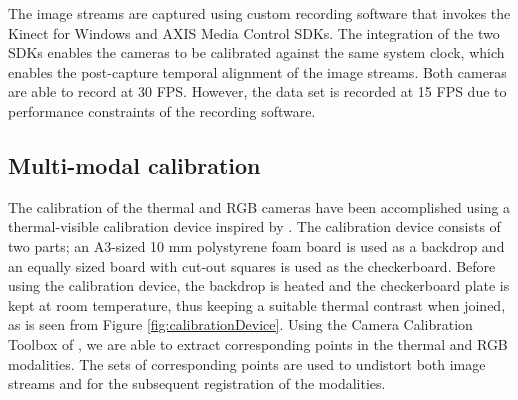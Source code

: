\documentclass[10pt,twocolumn,letterpaper]{article}
\begin{document}
The image streams are captured using custom recording software that invokes the Kinect for Windows and AXIS Media Control SDKs. The integration of the two SDKs enables the cameras to be calibrated against the same system clock, which enables the post-capture temporal alignment of the image streams. Both cameras are able to record at 30 FPS. However, the data set is recorded at 15 FPS due to performance constraints of the recording software. 

\subsection{Multi-modal calibration}
The calibration of the thermal and RGB cameras have been accomplished using a thermal-visible calibration device inspired by \cite{vidas2012mask}. The calibration device consists of two parts; an A3-sized 10 mm polystyrene foam board is used as a backdrop and an equally sized board with cut-out squares is used as the checkerboard. Before using the calibration device, the backdrop is heated and the checkerboard plate is kept at room temperature, thus keeping a suitable thermal contrast when joined, as is seen from Figure \ref{fig:calibrationDevice}. %
Using the Camera Calibration Toolbox of \cite{bouguet2004camera}, we are able to extract corresponding points in the thermal and RGB modalities. The sets of corresponding points are used to undistort both image streams and for the subsequent registration of the modalities. 
\end{document}
